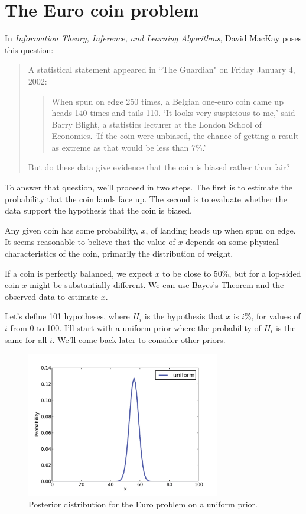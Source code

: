 \documentclass[12pt]{book}
\begin{document}
\section{The Euro coin problem}
\label{euro}

In {\it Information Theory, Inference, and Learning Algorithms}, David MacKay
poses this question:

\begin{quote}
A statistical statement appeared in ``The Guardian" on Friday January 4, 2002:

  \begin{quote}
        When spun on edge 250 times, a Belgian one-euro coin came
        up heads 140 times and tails 110.  `It looks very suspicious
        to me,' said Barry Blight, a statistics lecturer at the London
        School of Economics.  `If the coin were unbiased, the chance of
        getting a result as extreme as that would be less than 7\%.'
        \end{quote}

But do these data give evidence that the coin is biased rather than fair?
\end{quote}

To answer that question, we'll proceed in two steps.  The first
is to estimate the probability that the coin lands face up.  The second
is to evaluate whether the data support the hypothesis that the
coin is biased.

Any given coin has some probability, $x$, of landing heads up when spun
on edge.  It seems reasonable to believe that the value of $x$ depends
on some physical characteristics of the coin, primarily the distribution
of weight.

If a coin is perfectly balanced, we expect $x$ to be close to 50\%, but
for a lop-sided coin $x$ might be substantially different.  We can use
Bayes's Theorem and the observed data to estimate $x$.

Let's define 101 hypotheses, where $H_i$ is the hypothesis that
$x$ is $i$\%, for values of $i$ from 0 to 100.  I'll start with a uniform
prior where the probability of $H_i$ is the same for all $i$.  We'll
come back later to consider other priors.

\begin{figure}
\centerline{\includegraphics[height=2.5in]{figs/euro1.pdf}}
\caption{Posterior distribution for the Euro problem
on a uniform prior.}
\label{fig.euro1}
\end{figure}
\end{document}
